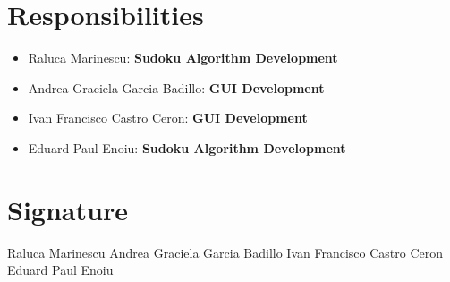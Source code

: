 \documentclass[12pt,a4paper]{article} %
\begin{document}
\section{Responsibilities}
 \begin{itemize}
\item Raluca Marinescu: \textbf{Sudoku Algorithm Development}
\item Andrea Graciela Garcia Badillo: \textbf{GUI Development}
\item Ivan Francisco Castro Ceron: \textbf{GUI Development}
\item Eduard Paul Enoiu: \textbf{Sudoku Algorithm Development}
\end{itemize}
\section{Signature}
\mbox{}
\newline
\mbox{}
\newline
Raluca Marinescu \hrulefill
\mbox{}
\newline
\mbox{}
\newline
\mbox{}
\newline
\mbox{}
\newline
Andrea Graciela Garcia Badillo \hrulefill
\mbox{}
\newline
\mbox{}
\newline
\mbox{}
\newline
\mbox{}
\newline
Ivan Francisco Castro Ceron \hrulefill
\mbox{}
\newline
\mbox{}
\newline
\mbox{}
\newline
\mbox{}
\newline
Eduard Paul Enoiu  \hrulefill
\end{document}

